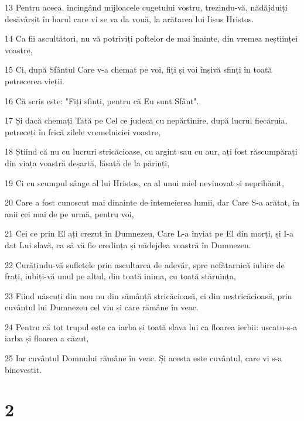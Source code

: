 \par 13 Pentru aceea, încingând mijloacele cugetului vostru, trezindu-vă, nădăjduiți desăvârșit în harul care vi se va da vouă, la arătarea lui Iisus Hristos.
\par 14 Ca fii ascultători, nu vă potriviți poftelor de mai înainte, din vremea neștiinței voastre,
\par 15 Ci, după Sfântul Care v-a chemat pe voi, fiți și voi înșivă sfinți în toată petrecerea vieții.
\par 16 Că scris este: "Fiți sfinți, pentru că Eu sunt Sfânt".
\par 17 Și dacă chemați Tată pe Cel ce judecă cu nepărtinire, după lucrul fiecăruia, petreceți în frică zilele vremelniciei voastre,
\par 18 Știind că nu cu lucruri stricăcioase, cu argint sau cu aur, ați fost răscumpărați din viața voastră deșartă, lăsată de la părinți,
\par 19 Ci cu scumpul sânge al lui Hristos, ca al unui miel nevinovat și neprihănit,
\par 20 Care a fost cunoscut mai dinainte de întemeierea lumii, dar Care S-a arătat, în anii cei mai de pe urmă, pentru voi,
\par 21 Cei ce prin El ați crezut în Dumnezeu, Care L-a înviat pe El din morți, și I-a dat Lui slavă, ca să vă fie credința și nădejdea voastră în Dumnezeu.
\par 22 Curățindu-vă sufletele prin ascultarea de adevăr, spre nefățarnică iubire de frați, iubiți-vă unul pe altul, din toată inima, cu toată stăruința,
\par 23 Fiind născuți din nou nu din sămânță stricăcioasă, ci din nestricăcioasă, prin cuvântul lui Dumnezeu cel viu și care rămâne în veac.
\par 24 Pentru că tot trupul este ca iarba și toată slava lui ca floarea ierbii: uscatu-s-a iarba și floarea a căzut,
\par 25 Iar cuvântul Domnului rămâne în veac. Și acesta este cuvântul, care vi s-a binevestit.

\chapter{2}

